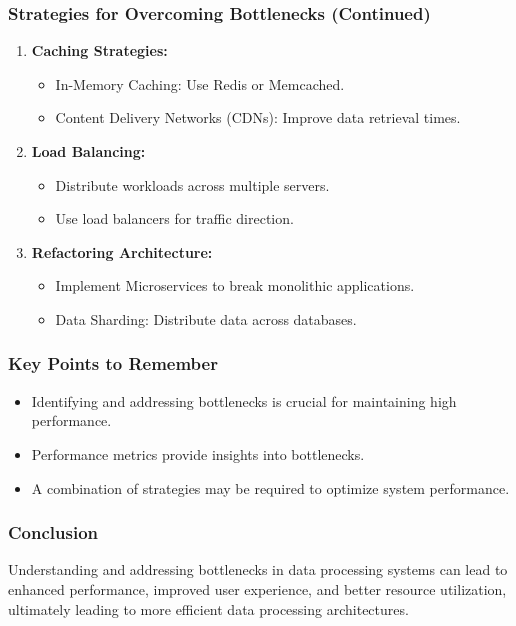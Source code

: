 \documentclass[aspectratio=169]{beamer}
\begin{document}
\begin{frame}[fragile]
    \frametitle{Strategies for Overcoming Bottlenecks (Continued)}
    \begin{enumerate}[resume]
        \item \textbf{Caching Strategies:}
            \begin{itemize}
                \item In-Memory Caching: Use Redis or Memcached.
                \item Content Delivery Networks (CDNs): Improve data retrieval times.
            \end{itemize}
        \item \textbf{Load Balancing:}
            \begin{itemize}
                \item Distribute workloads across multiple servers.
                \item Use load balancers for traffic direction.
            \end{itemize}
        \item \textbf{Refactoring Architecture:}
            \begin{itemize}
                \item Implement Microservices to break monolithic applications.
                \item Data Sharding: Distribute data across databases.
            \end{itemize}
    \end{enumerate}
\end{frame}

\begin{frame}[fragile]
    \frametitle{Key Points to Remember}
    \begin{itemize}
        \item Identifying and addressing bottlenecks is crucial for maintaining high performance.
        \item Performance metrics provide insights into bottlenecks.
        \item A combination of strategies may be required to optimize system performance.
    \end{itemize}
\end{frame}

\begin{frame}[fragile]
    \frametitle{Conclusion}
    Understanding and addressing bottlenecks in data processing systems can lead to enhanced performance, improved user experience, and better resource utilization, ultimately leading to more efficient data processing architectures.
\end{frame}
\end{document}
